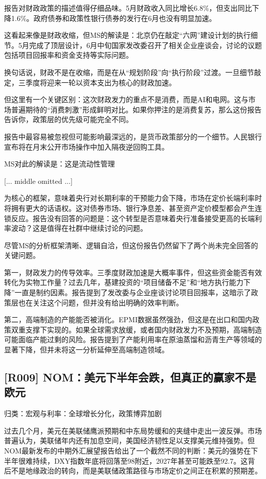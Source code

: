 \documentclass[11pt]{ctexart}
\begin{document}
报告对财政政策的描述值得仔细品味。5月财政收入同比增长6.8\%，但支出同比下降1.6\%。政府债券和政策性银行债券的发行在6月也没有明显加速。

这看起来像是财政收缩，但MS的解读是：北京仍在敲定“六网”建设计划的执行细节。5月完成了顶层设计，6月中旬国家发改委召开了相关企业座谈会，讨论的议题包括项目回报率和资金支持等实际问题。

换句话说，财政不是在收缩，而是在从“规划阶段”向“执行阶段”过渡。一旦细节敲定，三季度将迎来一轮以资本支出为核心的财政加速。

但这里有一个关键区别：这次财政发力的重点不是消费，而是AI和电网。这与市场普遍期待的“消费刺激”形成鲜明对比。如果你押注的是消费复苏，那么这份报告告诉你，政策层的优先级可能完全不同。

报告中最容易被忽视但可能影响最深远的，是货币政策部分的一个细节。人民银行宣布将在月末公开市场操作中加入隔夜逆回购工具。

MS对此的解读是：这是流动性管理

[... middle omitted ...]

为核心的框架，意味着央行对长期利率的干预能力会下降，市场在定价长端利率时将拥有更大的话语权。这对债券市场、银行净息差、甚至资产定价模型都会产生连锁反应。报告没有回答的问题是：这个转型是否意味着央行准备接受更高的长端利率波动？这是值得在社群中继续讨论的问题。

尽管MS的分析框架清晰、逻辑自洽，但这份报告仍然留下了两个尚未完全回答的关键问题。

第一，财政发力的传导效率。三季度财政加速是大概率事件，但这些资金能否有效转化为实物工作量？过去几年，基建投资的“项目储备不足”和“地方执行能力下降”一直是制约因素。报告提到了发改委与企业座谈讨论项目回报率，这暗示了政策层也在关注这个问题，但并没有给出明确的效率判断。

第二，高端制造的产能能否被消化。EPMI数据虽然强劲，但这是在出口和国内政策双重支撑下实现的。如果全球需求放缓，或者国内财政发力不及预期，高端制造可能面临产能过剩的风险。报告提到了产能利用率在原油蒸馏和沥青生产等领域的显著下降，但并未将这一分析延伸至高端制造领域。

\subsection{[R009] NOM：美元下半年会跌，但真正的赢家不是欧元}
{\small\color{refgray}归类：宏观与利率：全球增长分化，政策博弈加剧}

过去几个月，美元在美联储鹰派预期和中东局势缓和的夹缝中走出一波反弹。市场普遍认为，美联储年内还有加息空间，美国经济韧性足以支撑美元维持强势。但NOM最新发布的中期外汇展望报告给出了一个截然不同的判断：美元的强势在下半年很难持续，DXY指数年底将回落至98附近，2027年甚至可能跌至92.7。这背后不是地缘政治的转向，而是美联储政策路径与市场定价之间正在积累的预期差。
\end{document}
